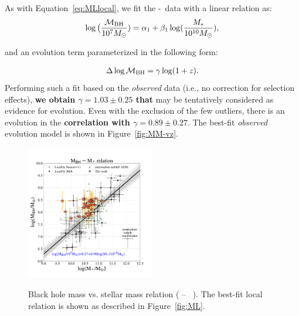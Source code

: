 \documentclass[apj]{emulateapj}
\begin{document}
As with Equation~\ref{eq:MLlocal}, we fit the \mbh-\smass\ data with a linear relation as:
\begin{eqnarray}
\label{eq:MMlocal}
\log \big( \frac{\mathcal M_{\rm BH}}{10^{7}M_{\odot}})= \alpha_1 + \beta_1 \log(\frac{M_*}{10^{10}M_{\odot}}),
\end {eqnarray}

\noindent and an evolution term parameterized in the following form:

\begin{eqnarray}
\label{eq:offset}
\Delta \log \mathcal M_{\rm BH}= \gamma \log (1 + z).
\end{eqnarray} 
Performing such a fit based on the {\it observed} data (i.e., no correction for selection effects), {\bf we obtain $\gamma  = 1.03 \pm 0.25$ that} may be tentatively considered as evidence for evolution. Even with the exclusion of the few outliers, there is an evolution in the {\bf correlation with $\gamma  = 0.89 \pm 0.27$}. The best-fit {\it observed} evolution model is shown in Figure~\ref{fig:MM-vz}.

\begin{figure}
\centering
{
\includegraphics[width=0.5\textwidth]{fig/MBH-Mstar.pdf}
}
\caption{\label{fig:MM} 
Black hole mass vs. stellar mass relation ( \mbh -- \smass\ ). The best-fit local relation is shown as described in Figure~\ref{fig:ML}.
}
\end{figure} 
\end{document}
